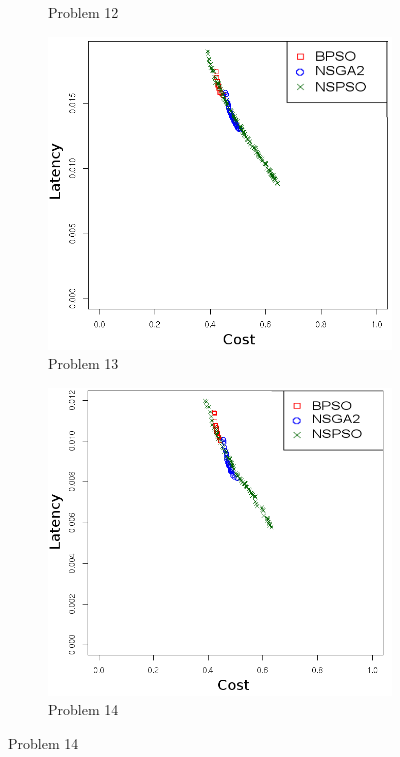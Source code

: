\begin{figure}[t]
\begin{subfigure}{0.30\textwidth}
	   \caption{Problem 12}
   \end{subfigure}
      \begin{subfigure}{0.30\textwidth}
       \includegraphics[width=\textwidth]{pics/nsgabpso13.png}
	   \caption{Problem 13}
   \end{subfigure}
      \begin{subfigure}{0.30\textwidth}
       \includegraphics[width=\textwidth]{pics/nsgabpso14.png}
	   \caption{Problem 14}
   \end{subfigure}
   \label{fig:nsgabpso}
\end{figure}

